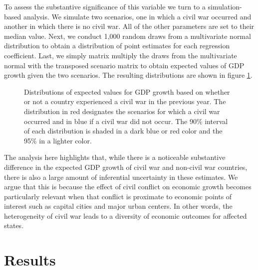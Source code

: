 To assess the substantive significance of this variable we turn to a simulation-based analysis. We simulate two scenarios, one in which a civil war occurred and another in which there is no civil war.  All of the other parameters are set to their median value. Next, we conduct 1,000 random draws from a multivariate normal distribution to obtain a distribution of point estimates for each regression coefficient. Last, we simply matrix multiply the draws from the multivariate normal with the transposed scenario matrix to obtain expected values of GDP growth given the two scenarios. The resulting distributions are shown in figure \ref{fig:civWarEffect}. 

\begin{figure}
	\centering
	\resizebox{.6\textwidth}{!}{}
	\caption{Distributions of expected values for GDP growth based on whether or not a country experienced a civil war in the previous year. The distribution in red designates the scenarios for which a civil war occurred and in blue if a civil war did not occur. The 90\% interval of each distribution is shaded in a dark blue or red color and the 95\% in a lighter color.}
	\label{fig:civWarEffect}	
\end{figure}
\FloatBarrier

The analysis here highlights that, while there is a noticeable substantive difference in the expected GDP growth of civil war and non-civil war countries, there is also a large amount of inferential uncertainty in these estimates. We argue that this is because the effect of civil conflict on economic growth becomes particularly relevant when that conflict is proximate to economic points of interest such as capital cities and major urban centers. In other words, the heterogeneity of civil war leads to a diversity of economic outcomes for affected states.
%
\section{Results}
\label{findings} 

